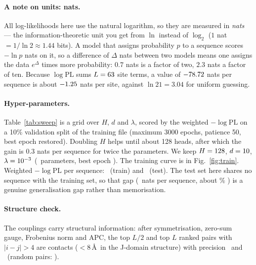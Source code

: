 \documentclass[10pt,a4paper]{article}
\begin{document}
\paragraph{A note on units: nats.} All log-likelihoods here use the natural logarithm, so they are
measured in \emph{nats} --- the information-theoretic unit you get from $\ln$ instead of $\log_2$
($1$ nat $=1/\ln2\approx1.44$ bits). A model that assigns probability $p$ to a sequence scores
$-\ln p$ nats on it, so a difference of $\Delta$ nats between two models means one assigns the data
$e^{\Delta}$ times more probability: $0.7$ nats is a factor of two, $2.3$ nats a factor of ten.
Because $\log\mathrm{PL}$ sums $L=63$ site terms, a value of $-78.72$ nats per sequence is
about $-1.25$ nats per site, against $\ln 21=3.04$ for uniform guessing.

\paragraph{Hyper-parameters.} Table~\ref{tab:sweep} is a grid over $H$, $d$ and $\lambda$,
scored by the weighted $-\log\mathrm{PL}$ on a 10\% validation split of the training file
(maximum 3000 epochs, patience 50, best epoch restored). Doubling $H$ helps until about 128 heads, after
which the gain is $0.3$ nats per sequence for twice the parameters. We keep $H=128$, $d=10$,
$\lambda=10^{-3}$ (\Nparams\ parameters, best epoch \BestEpoch). The training curve is in
Fig.~\ref{fig:train}. Weighted $-\log\mathrm{PL}$ per sequence: \NLPLtrain\ (train) and \NLPLtest\
(test). The test set here shares no sequence with the training set, so that gap (\NLPLgap\ nats
per sequence, about \NLPLgapPct\% ) is a genuine generalisation gap rather than memorisation.

\paragraph{Structure check.} The couplings carry structural information: after
symmetrisation, zero-sum gauge, Frobenius norm and APC, the top $L/2$ and top $L$ ranked pairs
with $|i-j|>4$ are contacts ($<8$\,\AA\ in the J-domain structure) with precision \PPVLhalf\ and \PPVL\
(random pairs: \PPVbase).

\begin{table}[h]\centering\small

\caption{Hyper-parameter grid, sorted by validation $-\log\mathrm{PL}$ per sequence
(weighted, no penalty). Chosen model: second row.}\label{tab:sweep}
\end{table}
\end{document}
